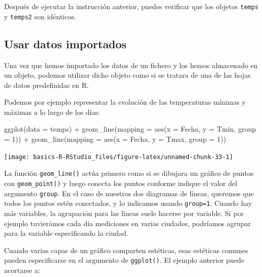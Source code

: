 \documentclass[
  title=normal,
  notoc,
  bib=normal]{mnye}
\newenvironment{Shaded}{\begin{snugshade}}{\end{snugshade}}
\newcommand{\AttributeTok}[1]{\textcolor[rgb]{0.77,0.63,0.00}{#1}}
\newcommand{\DecValTok}[1]{\textcolor[rgb]{0.00,0.00,0.81}{#1}}
\newcommand{\FunctionTok}[1]{\textcolor[rgb]{0.00,0.00,0.00}{#1}}
\newcommand{\NormalTok}[1]{#1}
\newcommand{\SpecialCharTok}[1]{\textcolor[rgb]{0.00,0.00,0.00}{#1}}
\begin{document}
Después de ejecutar la instrucción anterior, puedes verificar que los objetos \texttt{temps} y \texttt{temps2} son idénticos.

\hypertarget{usar-datos-importados}{%
\subsection{Usar datos importados}\label{usar-datos-importados}}

Una vez que hemos importado los datos de un fichero y los hemos almacenado en un objeto, podemos utilizar dicho objeto como si se tratara de una de las hojas de datos predefinidas en \textsf{R}.

Podemos por ejemplo representar la evolución de las temperaturas mínimas y máximas a lo largo de los días:

\begin{Shaded}
\begin{Highlighting}[]
\FunctionTok{ggplot}\NormalTok{(}\AttributeTok{data =}\NormalTok{ temps) }\SpecialCharTok{+} 
    \FunctionTok{geom\_line}\NormalTok{(}\AttributeTok{mapping =} \FunctionTok{aes}\NormalTok{(}\AttributeTok{x =}\NormalTok{ Fecha, }\AttributeTok{y =}\NormalTok{ Tmin, }\AttributeTok{group  =} \DecValTok{1}\NormalTok{)) }\SpecialCharTok{+} 
    \FunctionTok{geom\_line}\NormalTok{(}\AttributeTok{mapping =} \FunctionTok{aes}\NormalTok{(}\AttributeTok{x =}\NormalTok{ Fecha, }\AttributeTok{y =}\NormalTok{ Tmax, }\AttributeTok{group  =} \DecValTok{1}\NormalTok{)) }
\end{Highlighting}
\end{Shaded}

\begin{center}\texttt{[image: basics-R-RStudio\_files/figure-latex/unnamed-chunk-33-1]} \end{center}

La función \texttt{geom\_line()} actúa primero como si se dibujara un gráfico de puntos con \texttt{geom\_point()} y luego conecta los puntos conforme indique el valor del argumento \texttt{group}. En el caso de nuestros dos diagramas de líneas, queremos que todos los puntos estén conectados, y lo indicamos usando \texttt{group=1}. Cuando hay más variables, la agrupación para las líneas suele hacerse por variable. Si por ejemplo tuvierámos cada día mediciones en varias ciudades, podríamos agrupar para la variable especificando la ciudad.

Cuando varias capas de un gráfico comparten estéticas, esas estéticas comunes pueden especificarse en el argumento de \texttt{ggplot()}. El ejemplo anterior puede acortarse a:
\end{document}
